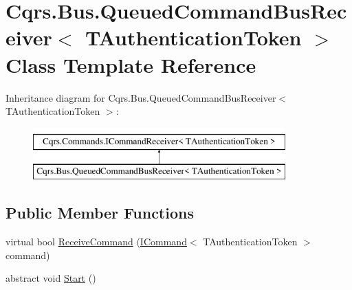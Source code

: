 \hypertarget{classCqrs_1_1Bus_1_1QueuedCommandBusReceiver}{}\section{Cqrs.\+Bus.\+Queued\+Command\+Bus\+Receiver$<$ T\+Authentication\+Token $>$ Class Template Reference}
\label{classCqrs_1_1Bus_1_1QueuedCommandBusReceiver}
Inheritance diagram for Cqrs.\+Bus.\+Queued\+Command\+Bus\+Receiver$<$ T\+Authentication\+Token $>$\+:\begin{figure}[H]
\begin{center}
\leavevmode
\includegraphics[height=2.000000cm]{classCqrs_1_1Bus_1_1QueuedCommandBusReceiver}
\end{center}
\end{figure}
\subsection*{Public Member Functions}
\begin{DoxyCompactItemize}
\item 
virtual bool \hyperlink{classCqrs_1_1Bus_1_1QueuedCommandBusReceiver_aad9ab381afcc8346479ab9cabdf1046a_aad9ab381afcc8346479ab9cabdf1046a}{Receive\+Command} (\hyperlink{interfaceCqrs_1_1Commands_1_1ICommand}{I\+Command}$<$ T\+Authentication\+Token $>$ command)
\item 
abstract void \hyperlink{classCqrs_1_1Bus_1_1QueuedCommandBusReceiver_ad8bf3c1f9d9b0444cb85784cb9e59823_ad8bf3c1f9d9b0444cb85784cb9e59823}{Start} ()
\end{DoxyCompactItemize}
